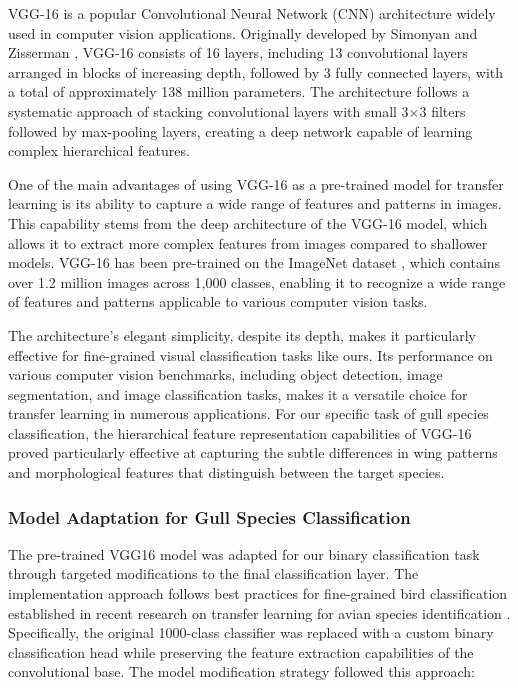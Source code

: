 \documentclass[a4paper,12pt]{article}
\begin{document}
VGG-16 is a popular Convolutional Neural Network (CNN) architecture widely used in computer vision applications. Originally developed by Simonyan and Zisserman \citep{simonyan2014vgg}, VGG-16 consists of 16 layers, including 13 convolutional layers arranged in blocks of increasing depth, followed by 3 fully connected layers, with a total of approximately 138 million parameters. The architecture follows a systematic approach of stacking convolutional layers with small 3$\times$3 filters followed by max-pooling layers, creating a deep network capable of learning complex hierarchical features.

One of the main advantages of using VGG-16 as a pre-trained model for transfer learning is its ability to capture a wide range of features and patterns in images. This capability stems from the deep architecture of the VGG-16 model, which allows it to extract more complex features from images compared to shallower models. VGG-16 has been pre-trained on the ImageNet dataset \citep{deng2009imagenet}, which contains over 1.2 million images across 1,000 classes, enabling it to recognize a wide range of features and patterns applicable to various computer vision tasks.

The architecture's elegant simplicity, despite its depth, makes it particularly effective for fine-grained visual classification tasks like ours. Its performance on various computer vision benchmarks, including object detection, image segmentation, and image classification tasks, makes it a versatile choice for transfer learning in numerous applications. For our specific task of gull species classification, the hierarchical feature representation capabilities of VGG-16 proved particularly effective at capturing the subtle differences in wing patterns and morphological features that distinguish between the target species.

\subsubsection{Model Adaptation for Gull Species Classification}

The pre-trained VGG16 model was adapted for our binary classification task through targeted modifications to the final classification layer. The implementation approach follows best practices for fine-grained bird classification established in recent research on transfer learning for avian species identification \citep{ghani2024comprehensive, reslan2022automatic}. Specifically, the original 1000-class classifier was replaced with a custom binary classification head while preserving the feature extraction capabilities of the convolutional base. The model modification strategy followed this approach:
\end{document}
